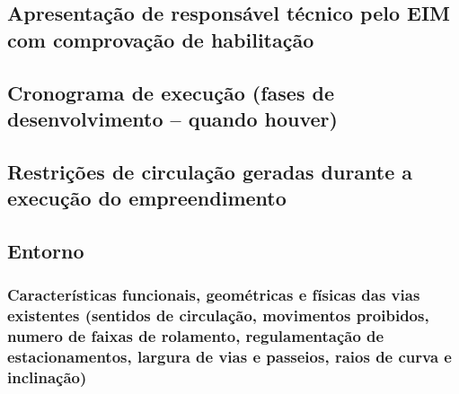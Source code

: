 \documentclass[]{article}
\begin{document}
\hypertarget{apresentauxe7uxe3o-de-responsuxe1vel-tuxe9cnico-pelo-eim-com-comprovauxe7uxe3o-de-habilitauxe7uxe3o}{%
\subsection{Apresentação de responsável técnico pelo EIM com comprovação
de
habilitação}\label{apresentauxe7uxe3o-de-responsuxe1vel-tuxe9cnico-pelo-eim-com-comprovauxe7uxe3o-de-habilitauxe7uxe3o}}

\hypertarget{cronograma-de-execuuxe7uxe3o-fases-de-desenvolvimento-quando-houver}{%
\subsection{Cronograma de execução (fases de desenvolvimento -- quando
houver)}\label{cronograma-de-execuuxe7uxe3o-fases-de-desenvolvimento-quando-houver}}

\hypertarget{restriuxe7uxf5es-de-circulauxe7uxe3o-geradas-durante-a-execuuxe7uxe3o-do-empreendimento}{%
\subsection{Restrições de circulação geradas durante a execução do
empreendimento}\label{restriuxe7uxf5es-de-circulauxe7uxe3o-geradas-durante-a-execuuxe7uxe3o-do-empreendimento}}

\hypertarget{entorno}{%
\subsection{Entorno}\label{entorno}}

\hypertarget{caracteruxedsticas-funcionais-geomuxe9tricas-e-fuxedsicas-das-vias-existentes-sentidos-de-circulauxe7uxe3o-movimentos-proibidos-numero-de-faixas-de-rolamento-regulamentauxe7uxe3o-de-estacionamentos-largura-de-vias-e-passeios-raios-de-curva-e-inclinauxe7uxe3o}{%
\subsubsection{Características funcionais, geométricas e físicas das
vias existentes (sentidos de circulação, movimentos proibidos, numero de
faixas de rolamento, regulamentação de estacionamentos, largura de vias
e passeios, raios de curva e
inclinação)}\label{caracteruxedsticas-funcionais-geomuxe9tricas-e-fuxedsicas-das-vias-existentes-sentidos-de-circulauxe7uxe3o-movimentos-proibidos-numero-de-faixas-de-rolamento-regulamentauxe7uxe3o-de-estacionamentos-largura-de-vias-e-passeios-raios-de-curva-e-inclinauxe7uxe3o}}
\end{document}
